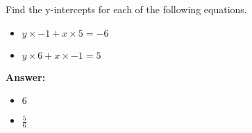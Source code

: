  Find the y-intercepts for each of the following equations. \begin{itemize}\item \( y \times -1 + x \times 5 = -6 \)\item \( y \times 6 + x \times -1 = 5 \)\end{itemize}

        \textbf{Answer:} \begin{itemize}\item \( 6 \)\item \( \frac{5}{6} \)\end{itemize}
